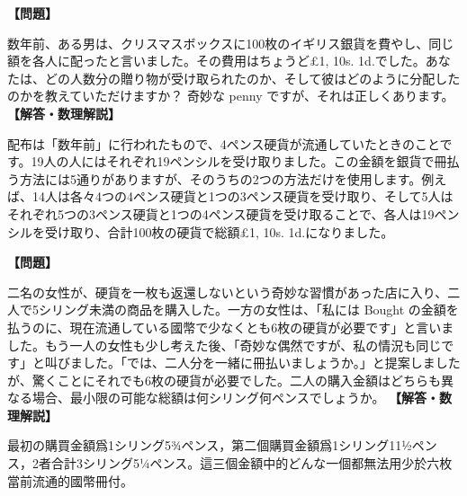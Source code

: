 \documentclass[10pt,a4paper,oneside,openany]{ltjsbook}
\begin{document}
\begin{tcolorbox}[colback=softblue,colframe=primaryblue,title=\textbf{第 23 問：クリスマスボックス （原題: THE CHRISTMAS-BOXES.）},arc=2mm,boxrule=1pt,breakable]
\textbf{【問題】}\par\vspace{0.3em}
数年前、ある男は、クリスマスボックスに100枚のイギリス銀貨を費やし、同じ額を各人に配ったと言いました。その費用はちょうど£1, 10s. 1d.でした。あなたは、どの人数分の贈り物が受け取られたのか、そして彼はどのように分配したのかを教えていただけますか？ 奇妙な penny ですが、それは正しくあります。
\tcblower
\textbf{【解答・数理解説】}\par\vspace{0.3em}
配布は「数年前」に行われたもので、4ペンス硬貨が流通していたときのことです。19人の人にはそれぞれ19ペンシルを受け取りました。この金額を銀貨で冊払う方法には5通りがありますが、そのうちの2つの方法だけを使用します。例えば、14人は各々4つの4ペンス硬貨と1つの3ペンス硬貨を受け取り、そして5人はそれぞれ5つの3ペンス硬貨と1つの4ペンス硬貨を受け取ることで、各人は19ペンシルを受け取り、合計100枚の硬貨で総額£1, 10s. 1d.になりました。
\end{tcolorbox}

\begin{tcolorbox}[colback=softblue,colframe=primaryblue,title=\textbf{第 24 問：買い物の難問 （原題: A SHOPPING PERPLEXITY.）},arc=2mm,boxrule=1pt,breakable]
\textbf{【問題】}\par\vspace{0.3em}
二名の女性が、硬貨を一枚も返還しないという奇妙な習慣があった店に入り、二人で5シリング未満の商品を購入した。一方の女性は、「私には Bought の金額を払うのに、現在流通している國幣で少なくとも6枚の硬貨が必要です」と言いました。もう一人の女性も少し考えた後、「奇妙な偶然ですが、私の情況も同じです」と叫びました。「では、二人分を一緒に冊払いましょうか。」と提案しましたが、驚くことにそれでも6枚の硬貨が必要でした。二人の購入金額はどちらも異なる場合、最小限の可能な総額は何シリング何ペンスでしょうか。
\tcblower
\textbf{【解答・数理解説】}\par\vspace{0.3em}
最初の購買金額爲1シリング5¾ペンス，第二個購買金額爲1シリング11½ペンス，2者合計3シリング5¼ペンス。這三個金額中的どんな一個都無法用少於六枚當前流通的國幣冊付。
\end{tcolorbox}
\end{document}
